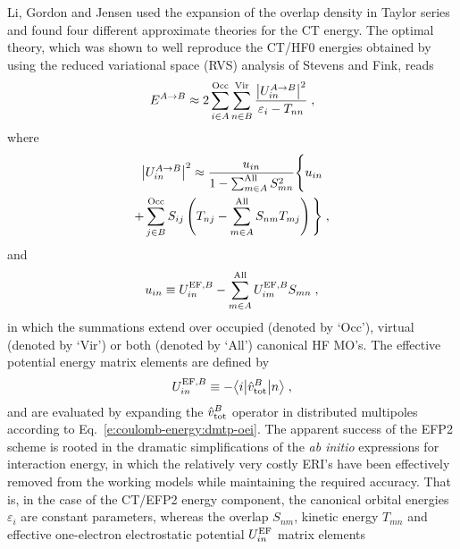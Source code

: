 \documentclass[aip,jcp,amsmath,amssymb,reprint,floatfix]{revtex4-1}
\begin{document}
Li, Gordon and Jensen used the expansion of the overlap density 
in Taylor series and found four different approximate
theories for the CT energy.\cite{Li.Gordon.Jensen.JCP.2006} 
The optimal theory, which was shown
to well reproduce the CT/HF0 energies obtained by using 
the reduced variational space (RVS)
analysis of Stevens and Fink\cite{Stevens.Fink.CPL.1987},
reads
%
\begin{equation} \label{e:u-efp2-ct}
 E^{A\rightarrow B} \approx 
 2\sum_{i\in A}^{\rm Occ}
  \sum_{n\in B}^{\rm Vir}
   \frac{ \left| U_{in}^{A\rightarrow B} \right|^2}{\varepsilon_{i} - T_{nn}} \;,
\end{equation}
%
where
%
\begin{multline} \label{e:u-efp2-ct-v2}
 \left| U_{in}^{A\rightarrow B} \right|^2 \approx
 \frac{u_{in}}{1-\sum_{m\in A}^{\rm All} S_{mn}^2}
 \Bigg\{
   u_{in} \\ + \sum_{j\in B}^{\rm Occ} S_{ij} 
   \left( 
     T_{nj} - \sum_{m\in A}^{\rm All} S_{nm} T_{mj}
   \right)
 \Bigg\} \;,
\end{multline}
%
and 
%
\begin{equation} \label{e:uin-efp2}
 u_{in} \equiv U_{in}^{{\rm EF},B} - \sum_{m\in A}^{\rm All} U_{im}^{{\rm EF},B} S_{mn} \;,
\end{equation}
%
in which the summations extend over occupied (denoted by `Occ'), virtual (denoted by `Vir') 
or both (denoted by `All') canonical HF MO's. The effective potential energy
matrix elements are defined by
%
\begin{equation} \label{e:v-efp2-eff}
 U_{in}^{{\rm EF},B} \equiv 
 -\bigl\langle {i} \bigl\lvert {\hat{v}^B_{\rm tot} } \bigl\lvert {n} \bigr\rangle \;,
\end{equation}
%
and are evaluated by expanding the $\hat{v}^B_{\rm tot}$ operator
in distributed multipoles according to Eq.~\eqref{e:coulomb-energy:dmtp-oei}.
The apparent success of the EFP2 scheme is rooted in the dramatic simplifications of the
\emph{ab initio} expressions for interaction energy, in which
the relatively very costly ERI's
have been effectively removed from the working models while maintaining the required accuracy. 
That is, in the case of the CT/EFP2 energy component, 
the canonical orbital energies $\varepsilon_i$ are
constant parameters, whereas the overlap $S_{nm}$, kinetic energy $T_{mn}$ and effective
one\hyp{}electron electrostatic potential $U_{in}^{{\rm EF}}$ matrix elements
\end{document}
